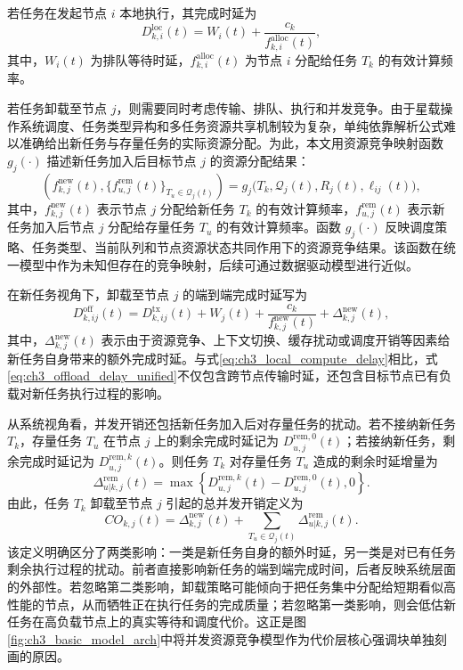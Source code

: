 若任务在发起节点 $i$ 本地执行，其完成时延为
\begin{equation}
    D_{k,i}^{\mathrm{loc}}(t)=W_i(t)+\frac{c_k}{f_{k,i}^{\mathrm{alloc}}(t)},
    \label{eq:ch3_local_compute_delay}
\end{equation}
其中，$W_i(t)$ 为排队等待时延，$f_{k,i}^{\mathrm{alloc}}(t)$ 为节点 $i$ 分配给任务 $T_k$ 的有效计算频率。

若任务卸载至节点 $j$，则需要同时考虑传输、排队、执行和并发竞争。由于星载操作系统调度、任务类型异构和多任务资源共享机制较为复杂，单纯依靠解析公式难以准确给出新任务与存量任务的实际资源分配。为此，本文用资源竞争映射函数 $g_j(\cdot)$ 描述新任务加入后目标节点 $j$ 的资源分配结果：
\begin{equation}
    \left(f_{k,j}^{\mathrm{new}}(t),\{f_{u,j}^{\mathrm{rem}}(t)\}_{T_u\in\mathcal{Q}_j(t)}\right)
    =g_j\big(T_k,\mathcal{Q}_j(t),R_j(t),\ell_{ij}(t)\big),
    \label{eq:ch3_resource_competition_mapping}
\end{equation}
其中，$f_{k,j}^{\mathrm{new}}(t)$ 表示节点 $j$ 分配给新任务 $T_k$ 的有效计算频率，$f_{u,j}^{\mathrm{rem}}(t)$ 表示新任务加入后节点 $j$ 分配给存量任务 $T_u$ 的有效计算频率。函数 $g_j(\cdot)$ 反映调度策略、任务类型、当前队列和节点资源状态共同作用下的资源竞争结果。该函数在统一模型中作为未知但存在的竞争映射，后续可通过数据驱动模型进行近似。

在新任务视角下，卸载至节点 $j$ 的端到端完成时延写为
\begin{equation}
    D_{k,ij}^{\mathrm{off}}(t)=D_{k,ij}^{\mathrm{tx}}(t)+W_j(t)+\frac{c_k}{f_{k,j}^{\mathrm{new}}(t)}+\Delta_{k,j}^{\mathrm{new}}(t),
    \label{eq:ch3_offload_delay_unified}
\end{equation}
其中，$\Delta_{k,j}^{\mathrm{new}}(t)$ 表示由于资源竞争、上下文切换、缓存扰动或调度开销等因素给新任务自身带来的额外完成时延。与式\eqref{eq:ch3_local_compute_delay}相比，式\eqref{eq:ch3_offload_delay_unified}不仅包含跨节点传输时延，还包含目标节点已有负载对新任务执行过程的影响。

从系统视角看，并发开销还包括新任务加入后对存量任务的扰动。若不接纳新任务 $T_k$，存量任务 $T_u$ 在节点 $j$ 上的剩余完成时延记为 $D_{u,j}^{\mathrm{rem},0}(t)$；若接纳新任务，剩余完成时延记为 $D_{u,j}^{\mathrm{rem},k}(t)$。则任务 $T_k$ 对存量任务 $T_u$ 造成的剩余时延增量为
\begin{equation}
    \Delta_{u|k,j}^{\mathrm{rem}}(t)=
    \max\left\{D_{u,j}^{\mathrm{rem},k}(t)-D_{u,j}^{\mathrm{rem},0}(t),0\right\}.
    \label{eq:ch3_existing_task_delay_increase}
\end{equation}
由此，任务 $T_k$ 卸载至节点 $j$ 引起的总并发开销定义为
\begin{equation}
    CO_{k,j}(t)=\Delta_{k,j}^{\mathrm{new}}(t)+
    \sum_{T_u\in\mathcal{Q}_j(t)}\Delta_{u|k,j}^{\mathrm{rem}}(t).
    \label{eq:ch3_concurrency_overhead}
\end{equation}
该定义明确区分了两类影响：一类是新任务自身的额外时延，另一类是对已有任务剩余执行过程的扰动。前者直接影响新任务的端到端完成时间，后者反映系统层面的外部性。若忽略第二类影响，卸载策略可能倾向于把任务集中分配给短期看似高性能的节点，从而牺牲正在执行任务的完成质量；若忽略第一类影响，则会低估新任务在高负载节点上的真实等待和调度代价。这正是图\ref{fig:ch3_basic_model_arch}中将并发资源竞争模型作为代价层核心强调块单独刻画的原因。

